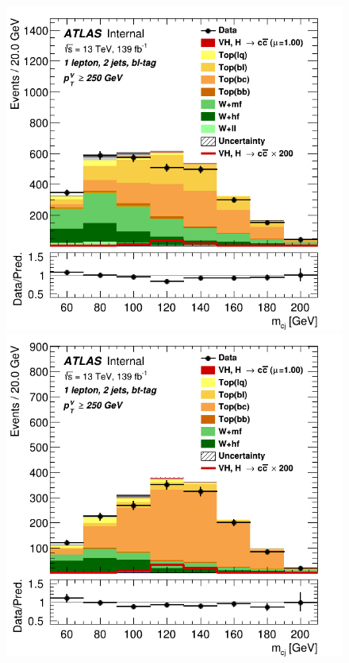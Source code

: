 \begin{figure}[h!]
\includegraphics[scale=0.2]{Images/VH/SRsandTopCRs/Region_distmBB_DtopCRBL_L1_Y6051_TTypebl_T1_J2_BMin250_Prefit.png}
\includegraphics[scale=0.2]{Images/VH/SRsandTopCRs/Region_distmBB_DtopCRBC_L1_Y6051_TTypebt_T1_J2_BMin250_Prefit.png}\\


\end{figure}

